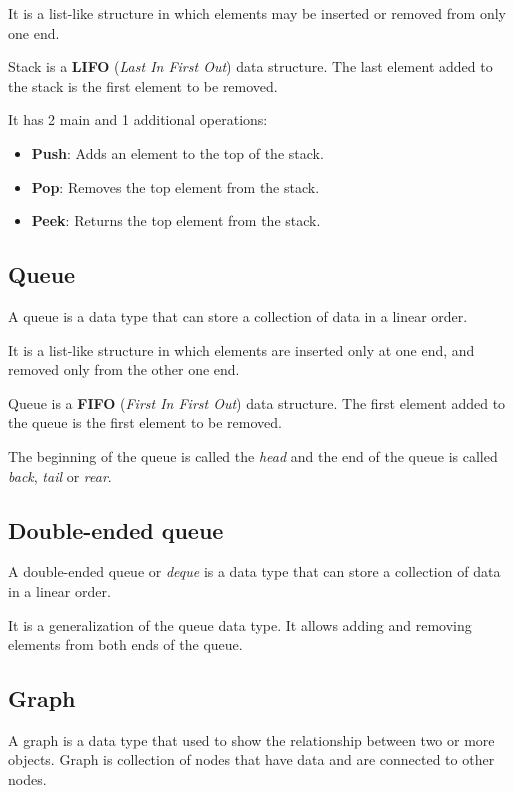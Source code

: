 \documentclass{book}
\begin{document}
    \noindent It is a list-like structure in which elements may be inserted or removed from only one end.

    \noindent Stack is a \textbf{LIFO} (\textit{Last In First Out}) data structure. The last element added to the stack is the first element to be removed.

    \noindent It has 2 main and 1 additional operations:
\begin{itemize}
\item\textbf{Push}: Adds an element to the top of the stack.
\item\textbf{Pop}: Removes the top element from the stack.
\item\textbf{Peek}: Returns the top element from the stack.
\end{itemize}


\subsection{Queue}

    A queue is a data type that can store a collection of data in a linear order.

    \noindent It is a list-like structure in which elements are inserted only at one end, and removed only from the other one end.

    \noindent Queue is a \textbf{FIFO} (\textit{First In First Out}) data structure. The first element added to the queue is the first element to be removed.

    \noindent The beginning of the queue is called the \textit{head} and the end of the queue is called \textit{back}, \textit{tail} or \textit{rear}.

\subsection{Double-ended queue}

    A double-ended queue or \textit{deque} is a data type that can store a collection of data in a linear order.

    \noindent It is a generalization of the queue data type. It allows adding and removing elements from both ends of the queue.

\subsection{Graph}

    A graph is a data type that used to show the relationship between two or more objects. Graph is collection of nodes that have data and are connected to other nodes.
\end{document}

